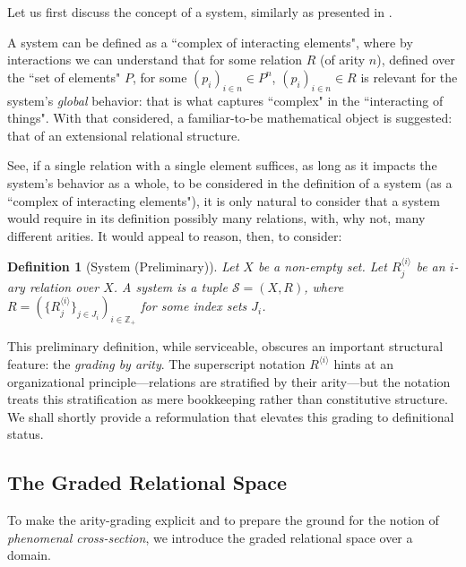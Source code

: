 \documentclass[12pt,a4paper]{article}
\newtheorem{definition}{Definition}[section]
\begin{document}
Let us first discuss the concept of a system, similarly as presented in \citet{bertalanffy1968}.

A system can be defined as a ``complex of interacting elements", where by interactions we can understand that for some relation $R$ (of arity $n$), defined over the ``set of elements" $P$, for some $(p_i)_{i \in n} \in P^n$, $(p_i)_{i \in n} \in R$ is relevant for the system's \textit{global} behavior: that is what captures ``complex" in the ``interacting of things". With that considered, a familiar-to-be mathematical object is suggested: that of an extensional relational structure.

See, if a single relation with a single element suffices, as long as it impacts the system's behavior as a whole, to be considered in the definition of a system (as a ``complex of interacting elements"), it is only natural to consider that a system would require in its definition possibly many relations, with, why not, many different arities. It would appeal to reason, then, to consider:

\begin{definition}[System (Preliminary)]
\label{def:system-prelim}
	Let $X$ be a non-empty set. Let $R^{\langle i \rangle}_j$ be an $i$-ary relation over $X$. A \textit{system} is a tuple $\mathcal{S} = (X, R)$, where $R = (\{R^{\langle i \rangle}_j\}_{j\in J_i})_{i\in \mathbb{Z}_+}$ for some index sets $J_i$.
\end{definition}

This preliminary definition, while serviceable, obscures an important structural feature: the \emph{grading by arity}. The superscript notation $R^{\langle i \rangle}$ hints at an organizational principle---relations are stratified by their arity---but the notation treats this stratification as mere bookkeeping rather than constitutive structure. We shall shortly provide a reformulation that elevates this grading to definitional status.

\subsection{The Graded Relational Space}

To make the arity-grading explicit and to prepare the ground for the notion of \emph{phenomenal cross-section}, we introduce the graded relational space over a domain.
\end{document}
